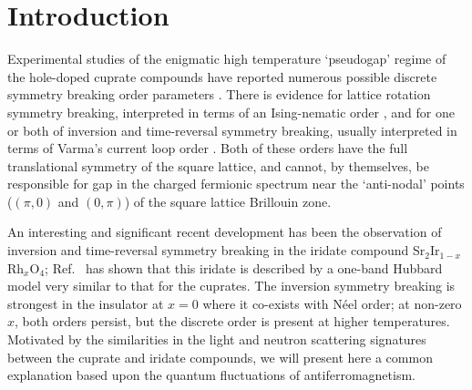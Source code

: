 \documentclass[aps,prb,preprint,onecolumn,citeautoscript,superscriptaddress,footinbib,
eqsecnum]{revtex4-1}
\begin{document}
\section{Introduction}
\label{sec:intro}

Experimental studies of the enigmatic high temperature `pseudogap' regime of the hole-doped cuprate compounds 
have reported numerous possible discrete symmetry breaking order parameters \cite{2002PhRvL..88m7005A,2006PhRvL..96s7001F,Hinkov597,2008arXiv0805.2959L,2008PhRvL.100l7002X,2010Natur.463..519D,2010Natur.468..283L,2010Natur.466..347L,2014PhRvL.112n7001L,2015NatCo...6E7705M,2016NatPh..12...32Z,2016arXiv161108603Z,2017arXiv170106485J}.
There is evidence for lattice rotation symmetry breaking, interpreted in terms of an Ising-nematic order \cite{kfe98}, and for one or both
of inversion and time-reversal symmetry breaking, usually interpreted in terms of Varma's current loop order \cite{1997PhRvB..5514554V,2002PhRvL..89x7003S,2003PhRvB..67e4511S}. Both of these orders have the full translational symmetry of the square lattice, and cannot, by themselves, be responsible for gap in the charged fermionic spectrum near the `anti-nodal' points ($(\pi, 0)$ and $(0,\pi)$) of the
square lattice Brillouin zone.

An interesting and significant recent development has been the observation of inversion \cite{2016NatPh..12...32Z} and time-reversal \cite{2017arXiv170106485J} symmetry breaking in the iridate compound
Sr$_2$Ir$_{1-x}$Rh$_x$O$_4$; 
Ref.~ has shown that this iridate is
described by a one-band Hubbard model very similar to that for the cuprates. The inversion symmetry breaking  is strongest in the insulator at $x=0$ where it co-exists with N\'eel order; at non-zero $x$, both orders persist, but the discrete order is present at higher temperatures. Motivated by the similarities in the light and neutron scattering signatures 
between the cuprate and iridate compounds, we will present here 
a common explanation based upon the quantum fluctuations of antiferromagnetism.
\end{document}
